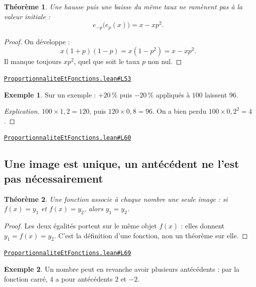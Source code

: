 \documentclass[11pt,a4paper]{article}
\theoremstyle{definition}
\newtheorem{exemple}{Exemple}
\theoremstyle{plain}
\newtheorem{theoreme}{Théorème}
\newenvironment{explication}{\begin{proof}[Explication]}{\end{proof}}
\newcommand{\source}[2]{\par\smallskip\noindent\hfill{\footnotesize\href{#1}{\texttt{#2}}}\par\smallskip}
\begin{document}
\begin{theoreme}
Une hausse puis une baisse du même taux ne ramènent pas à la valeur initiale :
\[ e_{-p}\bigl(e_p(x)\bigr) = x - xp^2 . \]
\end{theoreme}

\begin{proof}
On développe :
\[ x(1+p)(1-p) = x(1 - p^2) = x - xp^2 . \]
Il manque toujours $xp^2$, quel que soit le taux $p$ non nul.
\end{proof}
\source{https://github.com/Commutator-IO/learn-lean/blob/main/courses/01-college/05-proportionnalite-et-fonctions/ProportionnaliteEtFonctions.lean\#L53}{ProportionnaliteEtFonctions.lean\#L53}

\begin{exemple}
Sur un exemple : $+20\,\%$ puis $-20\,\%$ appliqués à $100$ laissent $96$.
\end{exemple}

\begin{explication}
$100 \times 1{,}2 = 120$, puis $120 \times 0{,}8 = 96$. On a bien perdu
$100 \times 0{,}2^2 = 4$.
\end{explication}
\source{https://github.com/Commutator-IO/learn-lean/blob/main/courses/01-college/05-proportionnalite-et-fonctions/ProportionnaliteEtFonctions.lean\#L60}{ProportionnaliteEtFonctions.lean\#L60}

\subsection{Une image est unique, un antécédent ne l'est pas nécessairement}

\begin{theoreme}
Une fonction associe à chaque nombre une seule image : si $f(x) = y_1$ et $f(x) = y_2$,
alors $y_1 = y_2$.
\end{theoreme}

\begin{proof}
Les deux égalités portent sur le même objet $f(x)$ : elles donnent $y_1 = f(x) = y_2$.
C'est la définition d'une fonction, non un théorème sur elle.
\end{proof}
\source{https://github.com/Commutator-IO/learn-lean/blob/main/courses/01-college/05-proportionnalite-et-fonctions/ProportionnaliteEtFonctions.lean\#L69}{ProportionnaliteEtFonctions.lean\#L69}

\begin{exemple}
Un nombre peut en revanche avoir plusieurs antécédents : par la fonction carré, $4$ a
pour antécédents $2$ et $-2$.
\end{exemple}
\end{document}
